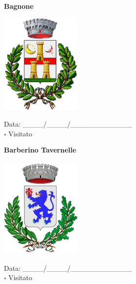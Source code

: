 \documentclass[a5paper,12pt]{article}
\begin{document}
\vspace{0.7cm}

\noindent
\begin{minipage}[t]{0.45\textwidth}
    \begin{center}
        \textbf{Bagnone}
    \end{center}
    \vspace{-0.5cm} %
    \begin{center}
        \includegraphics[height= 5cm, width=4cm]{Toscana/Stemma Bagnone.png}
    \end{center}
    \vspace{-0.4cm} %
    \begin{flushleft}
        Data: \_\_\_\_/\_\_\_\_/\_\_\_\_\_\_\_\_\_\_\_\_ \\
        $\square$ Visitato
    \end{flushleft}
\end{minipage}
\hfill
\noindent
\begin{minipage}[t]{0.45\textwidth}
    \begin{center}
        \textbf{Barberino Tavernelle}
    \end{center}
    \vspace{-0.5cm} %
    \begin{center}
        \includegraphics[height= 5cm, width=4cm]{Toscana/Stemma Barberino Tavernelle.png}
    \end{center}
    \vspace{-0.4cm} %
    \begin{flushleft}
        Data: \_\_\_\_/\_\_\_\_/\_\_\_\_\_\_\_\_\_\_\_\_ \\
        $\square$ Visitato
    \end{flushleft}
\end{minipage}
\end{document}
